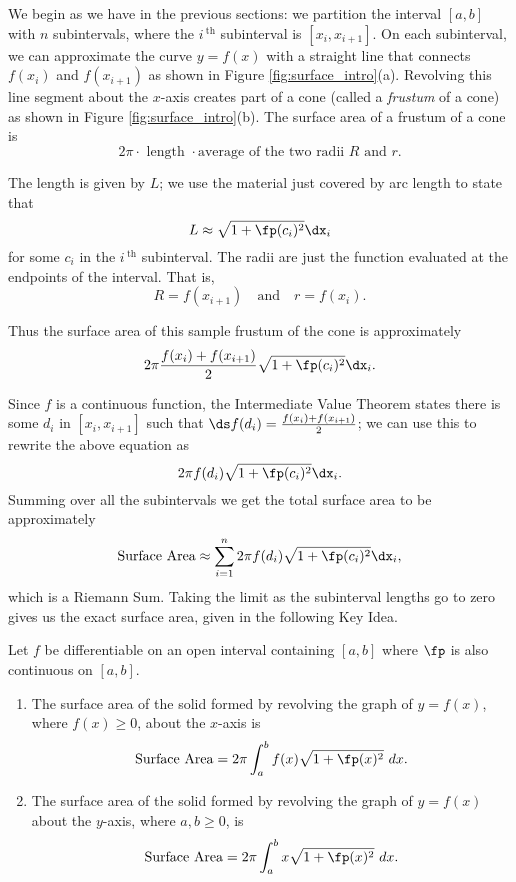 We begin as we have in the previous sections: we partition the interval $[a,b]$ with $n$ subintervals, where the $i\,^{\text{th}}$ subinterval is $[x_i,x_{i+1}]$. On each subinterval, we can approximate the curve $y=f(x)$ with a straight line that connects $f(x_i)$ and $f(x_{i+1})$ as shown in Figure \ref{fig:surface_intro}(a). Revolving this line segment about the $x$-axis creates part of a cone (called a \textit{frustum} of a cone) as shown in Figure \ref{fig:surface_intro}(b). The surface area of a frustum of a cone is $$2\pi\cdot\text{ length }\cdot\text{average of the two radii $R$ and $r$}.$$

The length is given by $L$; we use the material just covered by arc length to state that $$L\approx \sqrt{1+\fp(c_i)^2}\dx_i$$ for some $c_i$ in the $i\,^\text{th}$ subinterval. The radii are just the function evaluated at the endpoints of the interval. That is, $$R = f(x_{i+1})\quad \text{and}\quad r = f(x_i).$$

Thus the surface area of this sample frustum of the cone is approximately 
$$2\pi\frac{f(x_i)+f(x_{i+1})}2\sqrt{1+\fp(c_i)^2}\dx_i.$$

Since $f$ is a continuous function, the Intermediate Value Theorem states there is some $d_i$ in $[x_i,x_{i+1}]$ such that $\ds f(d_i) = \frac{f(x_i)+f(x_{i+1})}2$; we can use this to rewrite the above equation as
$$2\pi f(d_i)\sqrt{1+\fp(c_i)^2}\dx_i.$$
Summing over all the subintervals we get the total surface area to be approximately 
$$\text{Surface Area}\approx \sum_{i=1}^n 2\pi f(d_i)\sqrt{1+\fp(c_i)^2}\dx_i,$$
which is a Riemann Sum. Taking the limit as the subinterval lengths go to zero gives us the exact surface area, given in the following Key Idea.

{Let $f$ be differentiable on an open interval containing $[a,b]$ where $\fp$ is also continuous on $[a,b]$. 
	\begin{enumerate}
	\item	The surface area of the solid formed by revolving the graph of $y=f(x)$, where $f(x)\geq0$, about the $x$-axis is
	$$\text{Surface Area} = 2\pi\int_a^b f(x)\sqrt{1+\fp(x)^2}\ dx.$$
	\item	The surface area of the solid formed by revolving the graph of $y=f(x)$ about the $y$-axis, where $a,b\geq0$, is
	$$\text{Surface Area} = 2\pi\int_a^b x\sqrt{1+\fp(x)^2}\ dx.$$
	\end{enumerate}
}

